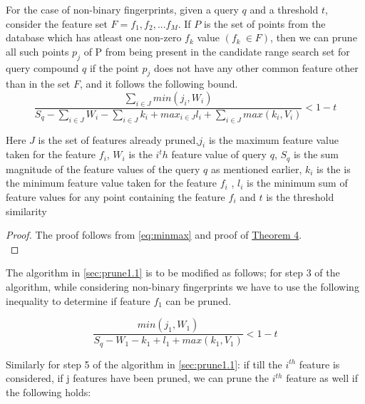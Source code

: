 \begin{thm}
\label{thm4bound}
For the case of non-binary fingerprints, given a query $q$ and a threshold $t$, consider the feature set $F=f_1, f_2,...f_M$. If $P$ is the set of points from the database which has atleast one non-zero $f_k$ value $(f_k~\in F)$, then we can prune all such points $p_j$ of P from being present in the candidate range search set for query compound $q$ if the point $p_j$ does not have any other common feature other than in the set $F$, and it follows the following bound. 
\begin{equation}
\label{eq:boun4}
\frac{\sum\limits_{i \in J}min(j_i,W_i)}{S_q - \sum\limits_{i \in J}W_i -\sum\limits_{i \in J}k_i + max_{i \in J}l_i + \sum\limits_{i \in J}max (k_i, V_i)}  < 1-t
\end{equation}	

Here $J$ is the set of features already pruned,$j_i$ is the maximum feature value taken for the feature $f_i$, $W_i$ is the $i^th$ feature value of query $q$, $S_q$ is the sum magnitude of the feature values of the query $q$ as mentioned earlier, $k_i$ is the is the minimum feature value taken for the feature $f_i$ , $l_i$ is the minimum sum of feature values for any point containing the feature $f_i$ and $t$ is the threshold similarity

\end{thm}

\begin{proof}
\label{proof4}
The proof follows from \autoref{eq:minmax} and proof of \hyperref[thm2bound]{Theorem 4}.\\ 
\end{proof}













The algorithm in \autoref{sec:prune1.1} is to be modified as follows; for step 3 of the algorithm, while considering non-binary fingerprints we have to use the following inequality to determine if feature $f_1$ can be pruned.

\begin{equation}
\label{nonbineq1}
\frac{min(j_1,W_1)}{S_q - W_1 -k_1 + l_1 + max (k_1, V_1)}  < 1-t
\end{equation}

Similarly for step 5 of the algorithm in \autoref{sec:prune1.1}: if till the $i^{th}$ feature is considered, if j features have been pruned, we can prune the $i^{th}$ feature as well if the following holds:
		

